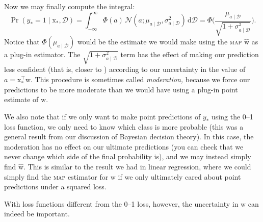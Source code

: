 \documentclass{article}
\newcommand{\acro}[1]{\textsc{\MakeLowercase{#1}}}
\newcommand{\given}{\mid}
\newcommand{\mc}[1]{\mathcal{#1}}
\newcommand{\data}{\mc{D}}
\newcommand{\intd}[1]{\,\mathrm{d}{#1}}
\newcommand{\trans}{^\top}
\renewcommand{\vec}[1]{\bm{\mathrm{#1}}}
\begin{document}
Now we may finally compute the integral:
\begin{equation*}
  \Pr(y_\ast = 1 \given \vec{x}_\ast, \data)
  =
  \int_{-\infty}^\infty
  \Phi(a)
  \,
  \mc{N}(a; \mu_{a \given \data}, \sigma^2_{a \given \data})
  \intd{\data}
  =
  \Phi
  \Biggl(
  \frac{\mu_{a \given \data}}{\sqrt{1 + \sigma^2_{a \given \data}}}
  \Biggr).
\end{equation*}
Notice that $\Phi(\mu_{a \given \data})$ would be the estimate we
would make using the \acro{MAP} $\hat{\vec{w}}$ as a plug-in
estimator.  The $\sqrt{1 + \sigma^2_{a \given \data}}$ term has the
effect of making our prediction less confident (that is, closer to
) according to our uncertainty in the value of $a =
\vec{x}_\ast\trans \vec{w}$.  This procedure is sometimes called
\emph{moderation,} because we force our predictions to be more
moderate than we would have using a plug-in point estimate of
$\vec{w}$.

We also note that if we only want to make point predictions of
$y_\ast$ using the 0--1 loss function, we only need to know which
class is more probable (this was a general result from our discussion
of Bayesian decision theory).  In this case, the moderation has no
effect on our ultimate predictions (you can check that we never change
which side of  the final probability is), and we may
instead simply find $\hat{\vec{w}}$.  This is similar to the result we
had in linear regression, where we could simply find the \acro{MAP}
estimator for $\vec{w}$ if we only ultimately cared about point
predictions under a squared loss.

With loss functions different from the 0--1 loss, however, the
uncertainty in $\vec{w}$ can indeed be important.
\end{document}
